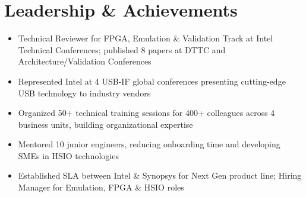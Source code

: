 \documentclass[10pt,letterpaper]{article}
\begin{document}

\section{Leadership \& Achievements}

\begin{itemize}
\item Technical Reviewer for FPGA, Emulation \& Validation Track at Intel Technical Conferences; published 8 papers at DTTC and Architecture/Validation Conferences
\item Represented Intel at 4 USB-IF global conferences presenting cutting-edge USB technology to industry vendors
\item Organized 50+ technical training sessions for 400+ colleagues across 4 business units, building organizational expertise
\item Mentored 10 junior engineers, reducing onboarding time and developing SMEs in HSIO technologies
\item Established SLA between Intel \& Synopsys for Next Gen product line; Hiring Manager for Emulation, FPGA \& HSIO roles
\end{itemize}
\end{document}
